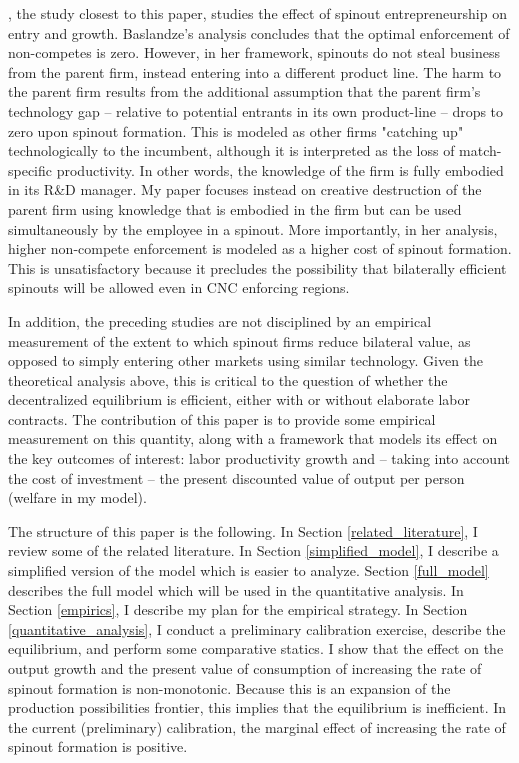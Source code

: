 \documentclass[11pt,english]{article}
\theoremstyle{remark}
\begin{document}
\cite{baslandze_spinout_2019}, the study closest to this paper, studies the effect of spinout entrepreneurship on entry and growth. Baslandze's analysis concludes that the optimal enforcement of non-competes is zero. However, in her framework, spinouts do not steal business from the parent firm, instead entering into a different product line. The harm to the parent firm results from the additional assumption that the parent firm's technology gap -- relative to potential entrants in its own product-line -- drops to zero upon spinout formation. This is modeled as other firms "catching up" technologically to the incumbent, although it is interpreted as the loss of match-specific productivity. In other words, the knowledge of the firm is fully embodied in its R\&D manager. My paper focuses instead on creative destruction of the parent firm using knowledge that is embodied in the firm but can be used simultaneously by the employee in a spinout.  More importantly, in her analysis, higher non-compete enforcement is modeled as a higher cost of spinout formation. This is unsatisfactory because it precludes the possibility that bilaterally efficient spinouts will be allowed even in CNC enforcing regions. 

In addition, the preceding studies are not disciplined by an empirical measurement of the extent to which spinout firms reduce bilateral value, as opposed to simply entering other markets using similar technology. Given the theoretical analysis above, this is critical to the question of whether the decentralized equilibrium is efficient, either with or without elaborate labor contracts. The contribution of this paper is to provide some empirical measurement on this quantity, along with a framework that models its effect on the key outcomes of interest: labor productivity growth and -- taking into account the cost of investment -- the present discounted value of output per person (welfare in my model).

The structure of this paper is the following. In Section \ref{related_literature}, I review some of the related literature. In Section \ref{simplified_model}, I describe a simplified version of the model which is easier to analyze. Section \ref{full_model} describes the full model which will be used in the quantitative analysis. In Section \ref{empirics}, I describe my plan for the empirical strategy. In Section \ref{quantitative_analysis}, I conduct a preliminary calibration exercise, describe the equilibrium, and perform some comparative statics. I show that the effect on the output growth and the present value of consumption of increasing the rate of spinout formation is non-monotonic. Because this is an expansion of the production possibilities frontier, this implies that the equilibrium is inefficient. In the current (preliminary) calibration, the marginal effect of increasing the rate of spinout formation is positive. 
\end{document}
